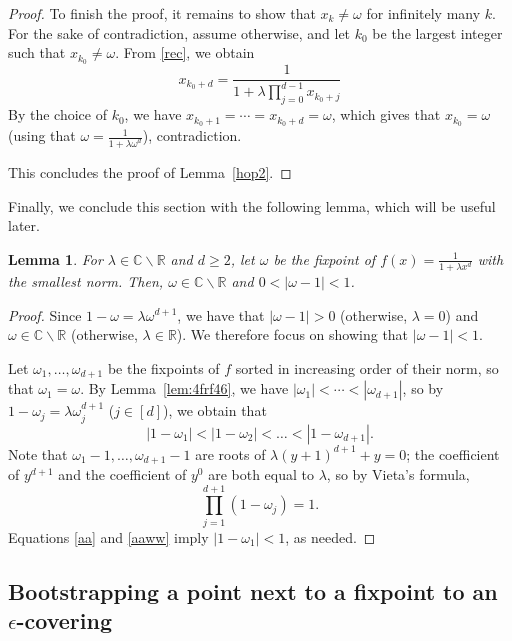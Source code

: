 \documentclass[11pt]{article}
\newtheorem{lemma}[theorem]{Lemma}
\def\Reals{\mathbb{R}}
\def\Complex{\mathbb{C}}
\newcommand{\eps}{\epsilon}
\begin{document}
\begin{proof}
To finish the proof, it remains to show that $x_k\neq \omega$ for infinitely many $k$. For the sake of contradiction, assume otherwise, and let $k_0$ be the largest integer such that $x_{k_0}\neq \omega$. From \eqref{rec}, we obtain
\[x_{k_0+d}=\frac{1}{1+\lambda \prod^{d-1}_{j=0}x_{k_0+j}}\]
By the choice of $k_0$, we have $x_{k_0+1}=\cdots=x_{k_0+d}=\omega$, which gives that $x_{k_0}=\omega$ (using that $\omega=\frac{1}{1+\lambda \omega^d}$), contradiction. 

This concludes the proof of Lemma~\ref{hop2}.
\end{proof}

Finally, we conclude this section with the following lemma, which will be useful later.
\begin{lemma}\label{uiopa}
For $\lambda\in \Complex\backslash \Reals$ and $d\geq 2$, let $\omega$ be the
fixpoint of $f(x)=\frac{1}{1+\lambda x^d}$  with the smallest norm. Then, $\omega\in \Complex\backslash \Reals$ and $0<|\omega-1|<1$.
\end{lemma}
\begin{proof}
Since $1-\omega = \lambda\omega^{d+1}$, we have that $|\omega-1|>0$ (otherwise, $\lambda=0$) and $\omega\in \Complex\backslash \Reals$ (otherwise, $\lambda\in \Reals$). We therefore focus on showing that $|\omega-1|<1$. 

Let $\omega_1,\dots,\omega_{d+1}$ be the
fixpoints of $f$  sorted in increasing order of their norm, so that $\omega_1=\omega$. By Lemma~\ref{lem:4frf46}, we have $|\omega_1|<\cdots<|\omega_{d+1}|$, so by $1-\omega_j = \lambda\omega_j^{d+1}$ ($j\in [d]$),  we obtain that
\begin{equation}\label{aa}
|1-\omega_1|<|1-\omega_2|<\dots<|1-\omega_{d+1}|.
\end{equation}
Note that $\omega_1-1,\dots,\omega_{d+1}-1$ are roots of $\lambda(y+1)^{d+1} + y = 0$;  the coefficient of $y^{d+1}$ and the coefficient of $y^0$ are both equal to $\lambda$, so by Vieta's formula, 
\begin{equation}\label{aaww}
\prod_{j=1}^{d+1} (1-\omega_j)=1.
\end{equation}
Equations \eqref{aa} and \eqref{aaww} imply $|1-\omega_1|<1$, as needed.
\end{proof}



\subsection{Bootstrapping a point next to a fixpoint to an $\eps$-covering}\label{sec:45g45g4b}
\end{document}
